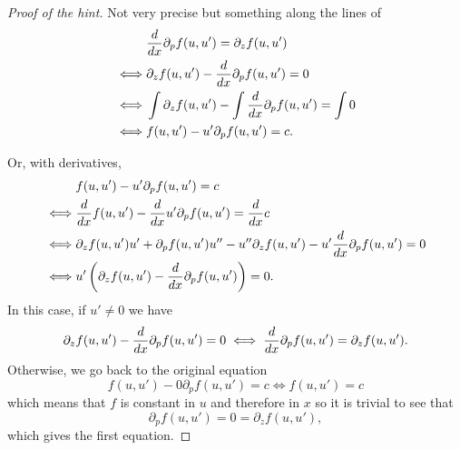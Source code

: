 \begin{proof}
  [Proof of the hint]
  Not very precise but something along the lines of
  \begin{align*}
         & \frac{d}{dx} \partial_p f(u, u') = \partial_z f(u, u') \\
    \iff & \partial_z f(u, u') - \frac{d}{dx} \partial_p f(u, u') = 0 \\
    \iff & \int \partial_z f(u, u') - \int \frac{d}{dx} \partial_p f(u, u') = \int 0 \\
    \iff & f(u, u') - u' \partial_p f(u, u') = c.
  \end{align*}

  Or, with derivatives,
  \begin{align*}
    & f(u, u') - u'\partial_p f(u, u') = c \\
    \iff & \frac{d}{dx} f(u, u') - \frac{d}{dx} u' \partial_p f(u, u') = \frac{d}{dx} c \\
    \iff & \partial_z f(u, u') u' + \partial_p f(u, u')u'' - u'' \partial_z f(u, u') - u' \frac{d}{dx} \partial_p f(u, u') = 0 \\
    \iff &u' \left( \partial_z f(u, u') - \frac{d}{dx} \partial_p f(u, u')\right) = 0.
  \end{align*}
  In this case, if $u' \neq 0$ we have
  \[
  \partial_z f(u, u') - \frac{d}{dx} \partial_p f(u, u') = 0 \iff
  \frac{d}{dx} \partial_p f(u, u') = \partial_z f(u, u').
  \]
  Otherwise, we go back to the original equation
  \[
    f(u, u') - 0 \partial_p f(u, u') = c \iff  f(u, u') = c
  \]
  which means that $f$ is constant in $u$ and therefore in $x$ so it is trivial to see that
  \[
    \partial_p f(u, u') = 0 = \partial_z f(u, u'),
  \]
  which gives the first equation.
\end{proof}


